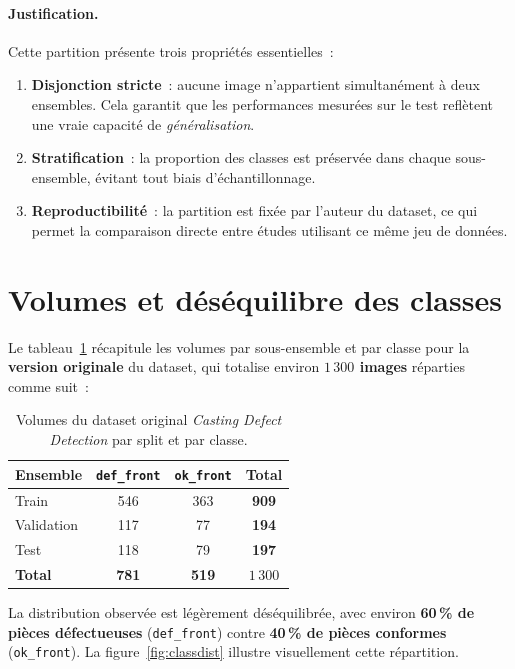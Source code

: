 \documentclass[12pt,a4paper,openany]{report}
\begin{document}
\paragraph{Justification.} Cette partition présente trois propriétés essentielles~:
\begin{enumerate}
    \item \textbf{Disjonction stricte}~: aucune image n'appartient simultanément à deux ensembles. Cela garantit que les performances mesurées sur le test reflètent une vraie capacité de \emph{généralisation}.
    \item \textbf{Stratification}~: la proportion des classes est préservée dans chaque sous-ensemble, évitant tout biais d'échantillonnage.
    \item \textbf{Reproductibilité}~: la partition est fixée par l'auteur du dataset, ce qui permet la comparaison directe entre études utilisant ce même jeu de données.
\end{enumerate}

\section{Volumes et déséquilibre des classes}

Le tableau~\ref{tab:volumes} récapitule les volumes par sous-ensemble et par classe pour la \textbf{version originale} du dataset, qui totalise environ \textbf{$1\,300$ images} réparties comme suit~:

\begin{table}[H]
\centering
\begin{tabular}{lccc}
\toprule
\textbf{Ensemble} & \texttt{def\_front} & \texttt{ok\_front} & \textbf{Total} \\
\midrule
Train       & 546 & 363 & \textbf{909}  \\
Validation  & 117 & 77  & \textbf{194}  \\
Test        & 118 & 79  & \textbf{197}  \\
\midrule
\textbf{Total} & \textbf{781} & \textbf{519} & \textbf{$1\,300$} \\
\bottomrule
\end{tabular}
\caption{Volumes du dataset original \emph{Casting Defect Detection} par split et par classe.}
\label{tab:volumes}
\end{table}

La distribution observée est légèrement déséquilibrée, avec environ \textbf{60\,\% de pièces défectueuses} (\texttt{def\_front}) contre \textbf{40\,\% de pièces conformes} (\texttt{ok\_front}). La figure~\ref{fig:classdist} illustre visuellement cette répartition.
\end{document}
